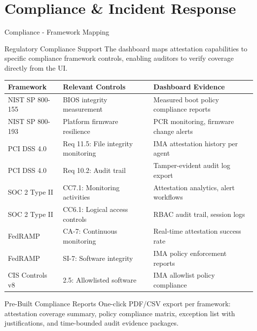\section{Compliance \& Incident Response}

\begin{frame}{Compliance - Framework Mapping}
  \begin{block}{Regulatory Compliance Support}
    \scriptsize
    The dashboard maps attestation capabilities to specific compliance framework controls,
    enabling auditors to verify coverage directly from the UI.
  \end{block}

  \vspace{0.1cm}

  \tiny
  \begin{center}
    \begin{tabular}{|l|p{3cm}|p{4.5cm}|}
      \hline
      \textbf{Framework} & \textbf{Relevant Controls} & \textbf{Dashboard Evidence} \\
      \hline
      \hline
      NIST SP 800-155 & BIOS integrity measurement & Measured boot policy compliance reports \\
      \hline
      NIST SP 800-193 & Platform firmware resilience & PCR monitoring, firmware change alerts \\
      \hline
      PCI DSS 4.0 & Req 11.5: File integrity monitoring & IMA attestation history per agent \\
      \hline
      PCI DSS 4.0 & Req 10.2: Audit trail & Tamper-evident audit log export \\
      \hline
      SOC 2 Type II & CC7.1: Monitoring activities & Attestation analytics, alert workflows \\
      \hline
      SOC 2 Type II & CC6.1: Logical access controls & RBAC audit trail, session logs \\
      \hline
      FedRAMP & CA-7: Continuous monitoring & Real-time attestation success rate \\
      \hline
      FedRAMP & SI-7: Software integrity & IMA policy enforcement reports \\
      \hline
      CIS Controls v8 & 2.5: Allowlisted software & IMA allowlist policy compliance \\
      \hline
    \end{tabular}
  \end{center}

  \vspace{0.1cm}

  \begin{exampleblock}{Pre-Built Compliance Reports}
    \scriptsize
    One-click PDF/CSV export per framework: attestation coverage summary,
    policy compliance matrix, exception list with justifications,
    and time-bounded audit evidence packages.
  \end{exampleblock}
\end{frame}

